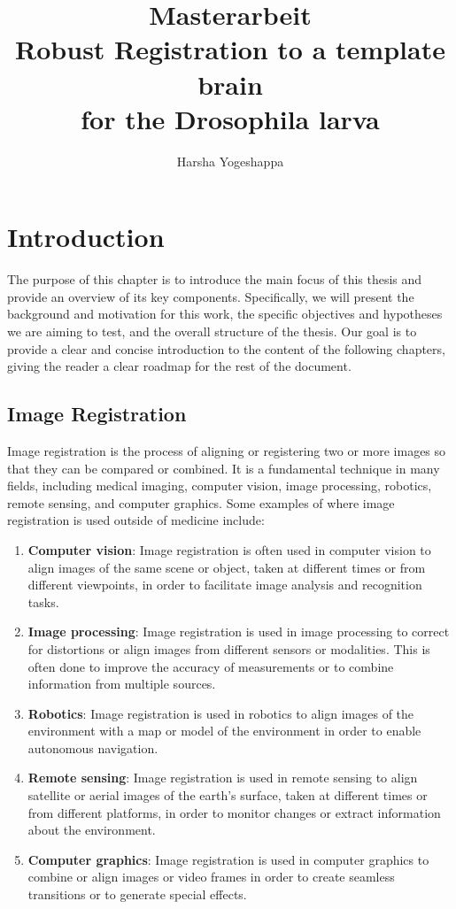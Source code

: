 \documentclass{book}
\title{
	Masterarbeit \\
	Robust Registration to a template brain  \\
	for the Drosophila larva \large }
\author{Harsha Yogeshappa}
\begin{document}
	\maketitle
	\newpage
	
	\hypersetup{linkcolor=rwth-blue-1}
	\tableofcontents	

	\newpage
	
	\chapter{Introduction}
	The purpose of this chapter is to introduce the main focus of this thesis and provide an overview of its key components. Specifically, we will present the background and motivation for this work, the specific objectives and hypotheses we are aiming to test, and the overall structure of the thesis. Our goal is to provide a clear and concise introduction to the content of the following chapters, giving the reader a clear roadmap for the rest of the document.
	
	\section{Image Registration}
	Image registration is the process of aligning or registering two or more images so that they can be compared or combined. It is a fundamental technique in many fields, including medical imaging, computer vision, image processing, robotics, remote sensing, and computer graphics. Some examples of where image registration is used outside of medicine include:
	\begin{enumerate}
		\item \textbf{Computer vision}: Image registration is often used in computer vision to align images of the same scene or object, taken at different times or from different viewpoints, in order to facilitate image analysis and recognition tasks.
		\item \textbf{Image processing}: Image registration is used in image processing to correct for distortions or align images from different sensors or modalities. This is often done to improve the accuracy of measurements or to combine information from multiple sources.
		\item \textbf{Robotics}: Image registration is used in robotics to align images of the environment with a map or model of the environment in order to enable autonomous navigation.
		\item \textbf{Remote sensing}: Image registration is used in remote sensing to align satellite or aerial images of the earth's surface, taken at different times or from different platforms, in order to monitor changes or extract information about the environment.
		\item \textbf{Computer graphics}: Image registration is used in computer graphics to combine or align images or video frames in order to create seamless transitions or to generate special effects.
	\end{enumerate}
	
\end{document}
